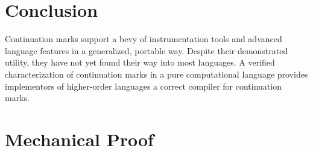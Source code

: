 \documentclass[ms,electronic,twosidetoc,letterpaper,chaptercenter,parttop]{byumsphd}
\begin{document}
\chapter{Conclusion}

Continuation marks support a bevy of instrumentation tools and advanced language features in a generalized, portable way. Despite their demonstrated utility, they have not yet found their way into most languages. A verified characterization of continuation marks in a pure computational language provides implementors of higher-order languages a correct compiler for continuation marks.




\appendix
\chapter{Mechanical Proof}

\newcommand{\trans}[2]{#1#2}
\end{document}
